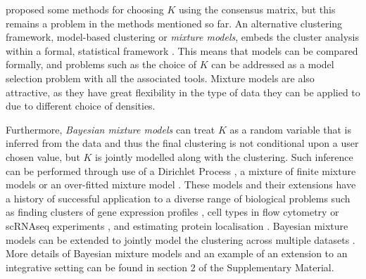 \documentclass{bioinfo}
\begin{document}
\cite{monti2003consensus} proposed some methods for choosing $K$ using the consensus matrix, but this remains a problem in the methods mentioned so far. An alternative clustering framework, model-based clustering or \emph{mixture models}, embeds the cluster analysis within a formal, statistical framework \citep{fraley2002model}. This means that models can be compared formally, and problems such as the choice of $K$ can be addressed as a model selection problem with all the associated tools. Mixture models are also attractive, as they have great flexibility in the type of data they can be applied to due to different choice of densities.

Furthermore, \emph{Bayesian mixture models} can treat $K$ as a random variable that is inferred from the data and thus the final clustering is not conditional upon a user chosen value, but $K$ is jointly modelled along with the clustering. Such inference can be performed through use of a Dirichlet Process \citep{ferguson1973bayesian}, a mixture of finite mixture models \citep{richardson1997bayesian, miller2018mixture} or an over-fitted mixture model \citep{rousseau2011asymptotic, van2015overfitting}. These models and their extensions have a history of successful application to a diverse range of biological problems such as finding clusters of gene expression profiles \citep{medvedovic2002bayesian}, cell types in flow cytometry \citep{chan2008statistical, hejblum2019sequential} or scRNAseq experiments \citep{prabhakaran2016dirichlet}, and estimating protein localisation \citep{crook2018bayesian}. Bayesian mixture models can be extended to jointly model the clustering across multiple datasets \citep{kirk2012bayesian, gabasova2017clusternomics}. More details of Bayesian mixture models and an example of an extension to an integrative setting can be found in section 2 of the Supplementary Material.


\end{document}
